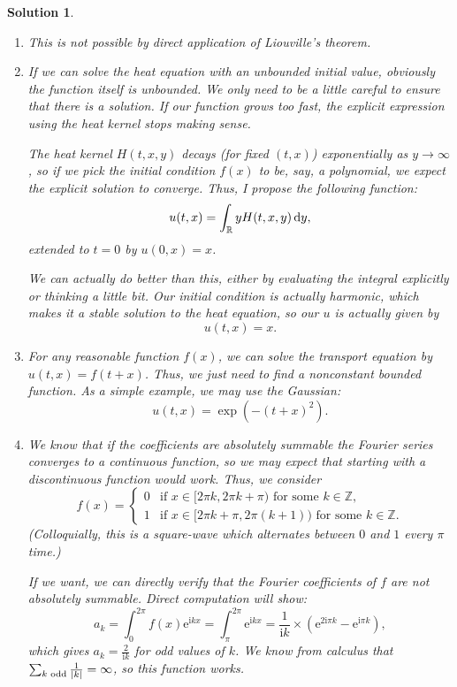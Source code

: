 \documentclass{article}
\theoremstyle{nonumberplain}
\newtheorem{sol}{Solution}
\newcommand{\R}{\mathbb{R}}
\newcommand{\Z}{\mathbb{Z}}
\newcommand{\e}{\mathrm{e}}
\newcommand{\I}{\mathrm{i}}
\DeclarePairedDelimiter{\abs}{\lvert}{\rvert}
\begin{document}
\begin{sol}
\leavevmode
\begin{enumerate}
\item This is not possible by direct application of Liouville's theorem.
\item If we can solve the heat equation with an unbounded initial value, obviously the function itself is unbounded. We only need to be a little careful to ensure that there is a solution. If our function grows too fast, the explicit expression using the heat kernel stops making sense.

The heat kernel $H(t,x,y)$ decays (for fixed $(t,x)$) exponentially as $y \to \infty$, so if we pick the initial condition $f(x)$ to be, say, a polynomial, we expect the explicit solution to converge. Thus, I propose the following function:
\begin{equation}
u(t,x) = \int_\R y H(t,x,y)  \dl y,
\end{equation}
extended to $t = 0$ by $u(0,x) = x$.

We can actually do better than this, either by evaluating the integral explicitly or thinking a little bit. Our initial condition is actually harmonic, which makes it a stable solution to the heat equation, so our $u$ is actually given by
\begin{equation}
u(t,x) = x.
\end{equation}
\item For any reasonable function $f(x)$, we can solve the transport equation by $u(t,x) = f(t+x)$. Thus, we just need to find a nonconstant bounded function. As a simple example, we may use the Gaussian:
\begin{equation}
u(t,x) = \exp(-(t+x)^2).
\end{equation}
\item We know that if the coefficients are absolutely summable the Fourier series converges to a continuous function, so we may expect that starting with a discontinuous function would work. Thus, we consider
\begin{equation}
f(x) = \begin{cases}
0 & \text{if $x \in [2\pi k, 2\pi k + \pi)$ for some $k \in \Z$,}\\
1 & \text{if $x \in [2\pi k + \pi, 2 \pi (k+1))$ for some $k \in \Z$.}
\end{cases}
\end{equation}
(Colloquially, this is a square-wave which alternates between $0$ and $1$ every $\pi$ time.)

If we want, we can directly verify that the Fourier coefficients of $f$ are not absolutely summable. Direct computation will show:
\begin{equation}
a_k = \int_0^{2\pi} f(x) \e^{\I k x} = \int_\pi^{2\pi} \e^{\I k x} = \frac1{\I k} \times (\e^{2 \I \pi k} - \e^{\I \pi k}),
\end{equation}
which gives $a_k = \frac2{\I k}$ for odd values of $k$. We know from calculus that $\sum_{k \text{ odd}} \frac1{\abs k} = \infty$, so this function works.
\end{enumerate}
\end{sol}
\end{document}
